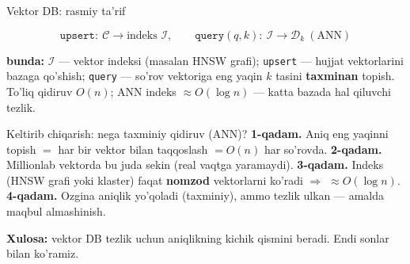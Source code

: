 \documentclass[aspectratio=169,11pt]{beamer}
\newcommand{\bunda}[1]{{\small\textbf{bunda:}\; #1}}
\begin{document}
\begin{frame}{Vektor DB: rasmiy ta'rif}
  \begin{tcolorbox}[defbox,title={Ta'rif: indeks, upsert, query}]
    \vspace{-0.4em}
    $$ \texttt{upsert}:\ \mathcal{C}\to \text{indeks } \mathcal{I}, \qquad
       \texttt{query}(q, k):\ \mathcal{I}\to \mathcal{D}_k \ (\text{ANN}) $$
  \end{tcolorbox}
  \vspace{2pt}
  \bunda{$\mathcal{I}$ --- vektor indeksi (masalan HNSW grafi); \texttt{upsert}
  --- hujjat vektorlarini bazaga qo'shish; \texttt{query} --- so'rov vektoriga
  eng yaqin $k$ tasini \textbf{taxminan} topish.}
  \vspace{4pt}
  \footnotesize To'liq qidiruv $O(n)$; ANN indeks $\approx O(\log n)$ --- katta
  bazada hal qiluvchi tezlik.
\end{frame}

\begin{frame}{Keltirib chiqarish: nega taxminiy qidiruv (ANN)?}
  \textbf{1-qadam.} Aniq eng yaqinni topish $=$ har bir vektor bilan taqqoslash
  $= O(n)$ har so'rovda.
  \pause
  \textbf{2-qadam.} Millionlab vektorda bu juda sekin (real vaqtga yaramaydi).
  \pause
  \textbf{3-qadam.} Indeks (HNSW grafi yoki klaster) faqat \textbf{nomzod}
  vektorlarni ko'radi $\Rightarrow$ $\approx O(\log n)$.
  \pause
  \textbf{4-qadam.} Ozgina aniqlik yo'qoladi (taxminiy), ammo tezlik ulkan ---
  amalda maqbul almashinish.
  \begin{tcolorbox}[okbox,top=2pt,bottom=2pt]
    \small \textbf{Xulosa:} vektor DB tezlik uchun aniqlikning kichik qismini
    beradi. Endi sonlar bilan ko'ramiz.
  \end{tcolorbox}
\end{frame}
\end{document}
